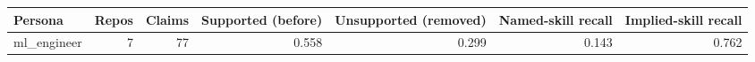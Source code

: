 \begin{tabular}{lrrrrrr}
\toprule
Persona & Repos & Claims & Supported (before) & Unsupported (removed) & Named-skill recall & Implied-skill recall \\
\midrule
ml\_engineer & 7 & 77 & 0.558 & 0.299 & 0.143 & 0.762 \\
\bottomrule
\end{tabular}
